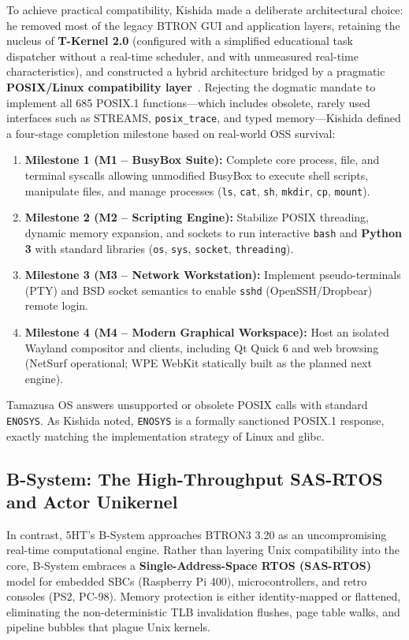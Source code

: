 \documentclass[10pt,journal,compsoc,twocolumn]{article}
\begin{document}
To achieve practical compatibility, Kishida made a deliberate architectural choice: he removed most of the legacy BTRON GUI and application layers, retaining the nucleus of \textbf{T-Kernel 2.0} (configured with a simplified educational task dispatcher without a real-time scheduler, and with unmeasured real-time characteristics), and constructed a hybrid architecture bridged by a pragmatic \textbf{POSIX/Linux compatibility layer}~\cite{kishida2026posixstrategy}. Rejecting the dogmatic mandate to implement all 685 POSIX.1 functions—which includes obsolete, rarely used interfaces such as STREAMS, \texttt{posix\_trace}, and typed memory—Kishida defined a four-stage completion milestone based on real-world OSS survival:
\begin{enumerate}[leftmargin=*]
    \item \textbf{Milestone 1 (M1 -- BusyBox Suite):} Complete core process, file, and terminal syscalls allowing unmodified BusyBox to execute shell scripts, manipulate files, and manage processes (\texttt{ls}, \texttt{cat}, \texttt{sh}, \texttt{mkdir}, \texttt{cp}, \texttt{mount}).
    \item \textbf{Milestone 2 (M2 -- Scripting Engine):} Stabilize POSIX threading, dynamic memory expansion, and sockets to run interactive \texttt{bash} and \textbf{Python 3} with standard libraries (\texttt{os}, \texttt{sys}, \texttt{socket}, \texttt{threading}).
    \item \textbf{Milestone 3 (M3 -- Network Workstation):} Implement pseudo-terminals (PTY) and BSD socket semantics to enable \texttt{sshd} (OpenSSH/Dropbear) remote login.
    \item \textbf{Milestone 4 (M4 -- Modern Graphical Workspace):} Host an isolated Wayland compositor and clients, including Qt Quick 6 and web browsing (NetSurf operational; WPE WebKit statically built as the planned next engine).
\end{enumerate}

Tamazusa OS answers unsupported or obsolete POSIX calls with standard \texttt{ENOSYS}. As Kishida noted, \texttt{ENOSYS} is a formally sanctioned POSIX.1 response, exactly matching the implementation strategy of Linux and glibc.

\subsection{B-System: The High-Throughput SAS-RTOS and Actor Unikernel}
In contrast, 5HT's B-System approaches BTRON3 3.20 as an uncompromising real-time computational engine. Rather than layering Unix compatibility into the core, B-System embraces a \textbf{Single-Address-Space RTOS (SAS-RTOS)} model for embedded SBCs (Raspberry Pi 400), microcontrollers, and retro consoles (PS2, PC-98). Memory protection is either identity-mapped or flattened, eliminating the non-deterministic TLB invalidation flushes, page table walks, and pipeline bubbles that plague Unix kernels. 
\end{document}
